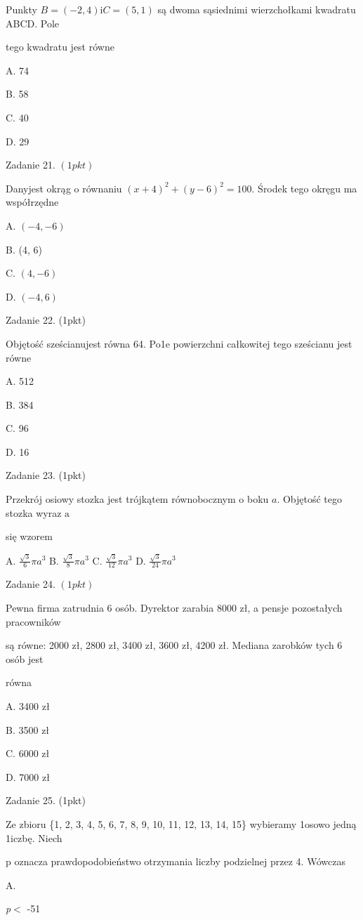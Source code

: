 \documentclass[a4paper,12pt]{article}
\begin{document}
Punkty $B=(-2,4) \mathrm{i} C=(5,1)$ są dwoma sąsiednimi wierzchołkami kwadratu ABCD. Pole

tego kwadratu jest równe

A. 74

B. 58

C. 40

D. 29

Zadanie 21. $(1pkt)$

Danyjest okrąg o równaniu $(x+4)^{2}+(y-6)^{2}=100$. Środek tego okręgu ma współrzędne

A. $(-4,-6)$

B. (4, 6)

C. $(4,-6)$

D. $(-4,6)$

Zadanie 22. (1pkt)

Objętość sześcianujest równa 64. Po1e powierzchni całkowitej tego sześcianu jest równe

A. 512

B. 384

C. 96

D. 16

Zadanie 23. (1pkt)

Przekrój osiowy stozka jest trójkątem równobocznym o boku $a$. Objętość tego stozka wyraz $\mathrm{a}$

się wzorem

A. $\displaystyle \frac{\sqrt{3}}{6}\pi a^{3}$ B. $\displaystyle \frac{\sqrt{3}}{8}\pi a^{3}$ C. $\displaystyle \frac{\sqrt{3}}{12}\pi a^{3}$ D. $\displaystyle \frac{\sqrt{3}}{24}\pi a^{3}$

Zadanie 24. $(1pkt)$

Pewna firma zatrudnia 6 osób. Dyrektor zarabia 8000 zł, a pensje pozostałych pracowników

są równe: 2000 zł, 2800 zł, 3400 zł, 3600 zł, 4200 zł. Mediana zarobków tych 6 osób jest

równa

A. 3400 zł

B. 3500 zł

C. 6000 zł

D. 7000 zł

Zadanie 25. (1pkt)

Ze zbioru \{1, 2, 3, 4, 5, 6, 7, 8, 9, 10, 11, 12, 13, 14, 15\} wybieramy 1osowo jedną 1iczbę. Niech

p oznacza prawdopodobieństwo otrzymania liczby podzielnej przez 4. Wówczas

A.

{\it p}$<$ -51
\end{document}
